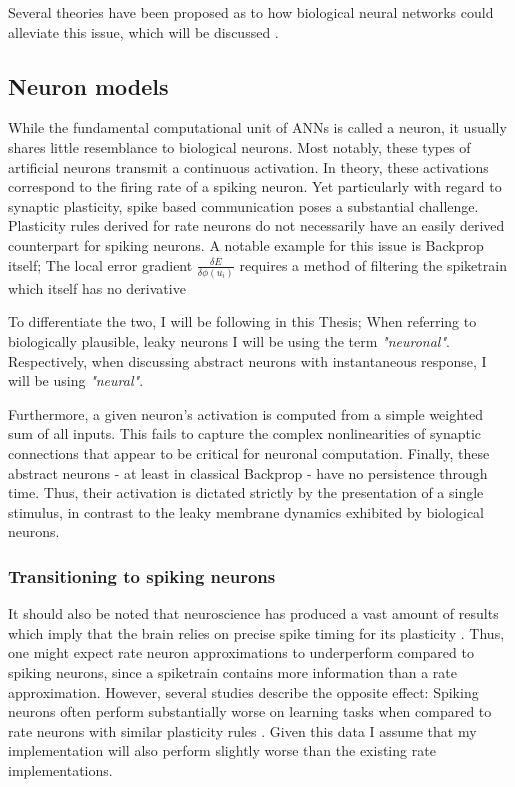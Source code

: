 Several theories have been proposed as to how biological neural networks could alleviate this issue, which will be
discussed .

\subsection{Neuron models}

While the fundamental computational unit of ANNs is called a neuron, it usually shares little resemblance to biological neurons.
Most notably, these types of artificial neurons transmit a continuous activation. In theory, these activations correspond
to the firing rate of a spiking neuron. Yet particularly with regard to synaptic plasticity, spike based communication
poses a substantial challenge. Plasticity rules derived for rate neurons do not necessarily have an easily derived 
counterpart for spiking neurons. A notable example for this issue is Backprop itself; The local error gradient
$\frac{\delta E}{\delta \phi(u_i)}$  requires a method of filtering the spiketrain which itself has no
derivative  


To differentiate the two, I will be following \cite{Haider2021} in this Thesis; When referring to biologically
plausible, leaky neurons I will be using the term \textit{"neuronal"}. Respectively, when discussing abstract neurons with
instantaneous response, I will be using \textit{"neural"}.

Furthermore, a given neuron's activation is computed from a simple weighted sum of all inputs. This fails to capture the
complex nonlinearities of synaptic connections that appear to be critical for neuronal computation. Finally, these
abstract neurons - at least in classical Backprop - have no persistence through time. Thus, their activation is dictated
strictly by the presentation of a single stimulus, in contrast to the leaky membrane dynamics exhibited by biological
neurons. 

\subsubsection{Transitioning to spiking neurons}

It should also be noted that neuroscience has produced a vast amount of results which imply that the brain relies on
precise spike timing for its plasticity . Thus, one might expect rate neuron approximations to underperform  
compared to spiking neurons, since a spiketrain contains more information than a rate approximation. However, several
studies describe the opposite effect: Spiking neurons often perform substantially worse on learning tasks when compared 
to rate neurons with similar plasticity rules \citep{Stapmanns2021} . 
Given this data I assume that my implementation will also perform slightly worse than the existing rate implementations.   



